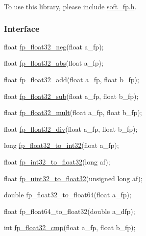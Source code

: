 To use this library, please include {\ttfamily \mbox{\hyperlink{a00077}{soft\+\_\+fp.\+h}}}.

\subsubsection*{Interface}


\begin{DoxyCode}
\textcolor{keywordtype}{float} \mbox{\hyperlink{a00074_a4702619cb8ca993b69919e1d7ca71f57}{fp\_float32\_neg}}(\textcolor{keywordtype}{float} a\_fp);

\textcolor{keywordtype}{float} \mbox{\hyperlink{a00074_a50dbb1be8035ed17c71df34d180056e0}{fp\_float32\_abs}}(\textcolor{keywordtype}{float} a\_fp);

\textcolor{keywordtype}{float} \mbox{\hyperlink{a00074_a05d59640c2e2b66e3f13e423c0779ce9}{fp\_float32\_add}}(\textcolor{keywordtype}{float} a\_fp, \textcolor{keywordtype}{float} b\_fp);

\textcolor{keywordtype}{float} \mbox{\hyperlink{a00074_a131916cff95f607242ea6affe3e50382}{fp\_float32\_sub}}(\textcolor{keywordtype}{float} a\_fp, \textcolor{keywordtype}{float} b\_fp);

\textcolor{keywordtype}{float} \mbox{\hyperlink{a00074_a4fb177861851cf018559768551298993}{fp\_float32\_mult}}(\textcolor{keywordtype}{float} a\_fp, \textcolor{keywordtype}{float} b\_fp);

\textcolor{keywordtype}{float} \mbox{\hyperlink{a00074_a02a02cf636799092e56f66a57d90d91b}{fp\_float32\_div}}(\textcolor{keywordtype}{float} a\_fp, \textcolor{keywordtype}{float} b\_fp);

\textcolor{keywordtype}{long} \mbox{\hyperlink{a00074_aab3c64f665ae99d4f267aef56d96be03}{fp\_float32\_to\_int32}}(\textcolor{keywordtype}{float} a\_fp);

\textcolor{keywordtype}{float} \mbox{\hyperlink{a00074_a13d2d336c17fa7ca9867415d017039f9}{fp\_int32\_to\_float32}}(\textcolor{keywordtype}{long} af);

\textcolor{keywordtype}{float} \mbox{\hyperlink{a00074_a096ed4a261247431549a71225761fffc}{fp\_uint32\_to\_float32}}(\textcolor{keywordtype}{unsigned} \textcolor{keywordtype}{long} af);

\textcolor{keywordtype}{double} fp\_float32\_to\_float64(\textcolor{keywordtype}{float} a\_fp);

\textcolor{keywordtype}{float} fp\_float64\_to\_float32(\textcolor{keywordtype}{double} a\_dfp);

\textcolor{keywordtype}{int} \mbox{\hyperlink{a00074_a55ee0ff6cc8f2a97c7079024577d33d3}{fp\_float32\_cmp}}(\textcolor{keywordtype}{float} a\_fp, \textcolor{keywordtype}{float} b\_fp);


\end{DoxyCode}
